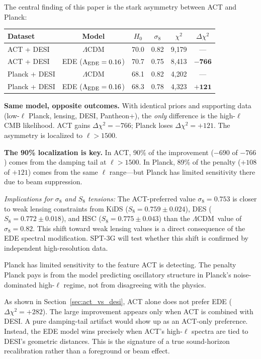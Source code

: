 \documentclass[twocolumn,showpacs,preprintnumbers,amsmath,amssymb,prd]{revtex4-2}
\newcommand{\lcdm}{$\Lambda$CDM}
\begin{document}
The central finding of this paper is the stark asymmetry between ACT and Planck:
\begin{center}
\begin{tabular}{lccccc}
\toprule
Dataset & Model & $H_0$ & $\sigma_8$ & $\chi^2$ & $\Delta\chi^2$ \\
\midrule
ACT + DESI & \lcdm & 70.0 & 0.82 & 9{,}179 & --- \\
ACT + DESI & EDE ($\Lambda_{\rm EDE} = 0.16$) & 70.7 & 0.75 & 8{,}413 & $\mathbf{-766}$ \\
\midrule
Planck + DESI & \lcdm & 68.1 & 0.82 & 4{,}202 & --- \\
Planck + DESI & EDE ($\Lambda_{\rm EDE} = 0.16$) & 68.3 & 0.78 & 4{,}323 & $\mathbf{+121}$ \\
\bottomrule
\end{tabular}
\end{center}

\textbf{Same model, opposite outcomes.} With identical priors and supporting 
data (low-$\ell$ Planck, lensing, DESI, Pantheon+), the \emph{only} difference 
is the high-$\ell$ CMB likelihood. ACT gains $\Delta\chi^2 = -766$; Planck 
loses $\Delta\chi^2 = +121$. The asymmetry is localized to $\ell > 1500$.

\textbf{The 90\% localization is key.} In ACT, 90\% of the improvement ($-690$ 
of $-766$) comes from the damping tail at $\ell > 1500$. In Planck, 89\% of 
the penalty ($+108$ of $+121$) comes from the same $\ell$ range---but Planck 
has limited sensitivity there due to beam suppression.

\emph{Implications for $\sigma_8$ and $S_8$ tensions:} The ACT-preferred 
value $\sigma_8 = 0.753$ is closer to weak lensing constraints from 
KiDS ($S_8 = 0.759 \pm 0.024$), DES ($S_8 = 0.772 \pm 0.018$), and HSC 
($S_8 = 0.775 \pm 0.043$) than the \lcdm\ value of $\sigma_8 = 0.82$. 
This shift toward weak lensing values is a direct consequence of the 
EDE spectral modification. SPT-3G will test whether this shift is 
confirmed by independent high-resolution data.

Planck has limited sensitivity to the feature ACT is detecting. The penalty 
Planck pays is from the model predicting oscillatory structure in Planck's 
noise-dominated high-$\ell$ regime, not from disagreeing with the physics.

As shown in Section~\ref{sec:act_vs_desi}, ACT alone does not prefer EDE 
($\Delta\chi^2 = +282$). The large improvement appears only when ACT is combined 
with DESI. A pure damping-tail artifact would show up as an ACT-only preference. 
Instead, the EDE model wins precisely when ACT's high-$\ell$ spectra are tied to 
DESI's geometric distances. This is the signature of a true sound-horizon 
recalibration rather than a foreground or beam effect.
\end{document}
